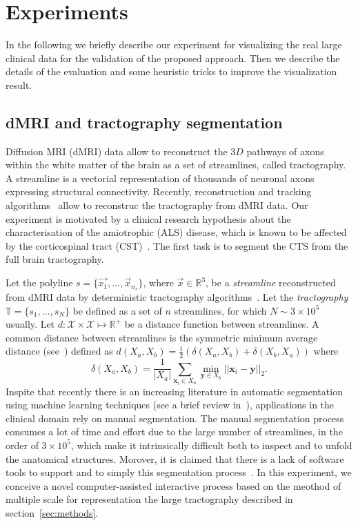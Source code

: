 \section{Experiments}
\label{sec:experiments}
In the following we briefly describe our experiment for visualizing the real large clinical data for the validation of the proposed approach. Then we describe the details of the evaluation and some heuristic tricks to improve the visualization result.
\subsection{dMRI and tractography segmentation}
Diffusion MRI (dMRI) data allow to reconstruct the $3D$ pathways of axons within the white matter of the brain as a set of
streamlines, called tractography. A streamline is a vectorial representation of thousands of neuronal axons expressing structural
connectivity. Recently, reconstruction and tracking algorithms~\cite{mori2002fiber,zhang2008identifying} allow to reconstruc the tractography from dMRI data. Our experiment is motivated by a clinical research hypothesis about the characterisation of the amiotrophic (ALS) disease, which is known to be affected by the corticospinal tract (CST)~\cite{cosottini2010evaluation,sage2009quantitative}. The first task is to segment the CTS from the full brain tractography. 

Let the polyline $s =\{ \vec{x_1},\ldots,\vec{x}_{n_s}\}$, where $\vec{x} \in \mathbb{R}^3$, be a \emph{streamline} reconstructed from dMRI data by deterministic tractography algorithms~\cite{mori2002fiber}. Let the \emph{tractography} $ \mathbb{T}  = \{s_1,\ldots,s_N\}$ be defined as a set of $n$ streamlines, for which $N \sim 3 \times 10^5$ usually. Let $d:\mathcal{X} \times
\mathcal{X} \mapsto \mathbb{R}^+$ be a distance function between
streamlines. A common distance between streamlines is the symmetric
minimum average distance (see~\cite{zhang2008identifying}) defined as
$d(X_a,X_b) = \frac{1}{2}(\delta(X_a,X_b) + \delta(X_b,X_a))$ where
\begin{equation}
  \label{equ:mam_distance}
  \delta(X_a,X_b) = \frac{1}{|X_a|} \sum_{\mathbf{x}_i \in X_a}
    \min_{\mathbf{y} \in X_b} ||\mathbf{x}_i - \mathbf{y}||_2.
\end{equation}
Inspite that recently there is an increasing literature in automatic
segmentation using machine learning techniques (see a brief review in~\cite{wang2011tractography,olivetti2011supervised}), applications in the
clinical domain rely on manual segmentation. The manual segmentation process consumes a lot of time and effort due to the large number of streamlines, in the order of $3 \times 10^5$, which make it intrinsically difficult both to inspect and to unfold the anatomical structures. Morover, 
it is claimed that there is a lack of software tools to support and to simply this segmentation process~\cite{olivetti2012fast}. In this experiment, we conceive a novel computer-assisted interactive process based on the meothod of multiple scale for representation the large tractography described in section~\ref{sec:methods}.
